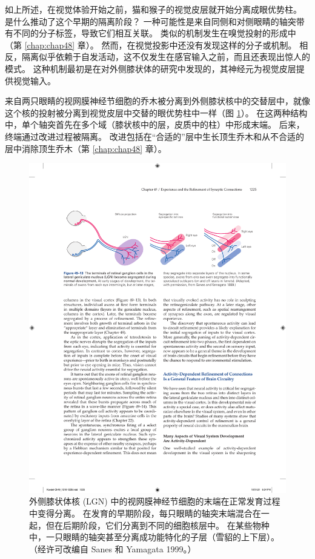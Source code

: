 如上所述，在视觉体验开始之前，猫和猴子的视觉皮层就开始分离成眼优势柱。
是什么推动了这个早期的隔离阶段？
一种可能性是来自同侧和对侧眼睛的轴突带有不同的分子标签，导致它们相互关联。
类似的机制发生在嗅觉投射的形成中（第 \ref{chap:chap48} 章）。
然而，在视觉投影中还没有发现这样的分子或机制。
相反，隔离似乎依赖于自发活动，这不仅发生在感官输入之前，而且还表现出惊人的模式。
这种机制最初是在对外侧膝状体的研究中发现的，其神经元为视觉皮层提供视觉输入。


来自两只眼睛的视网膜神经节细胞的乔木被分离到外侧膝状核中的交替层中，就像这个核的投射被分离到视觉皮层中交替的眼优势柱中一样（图 \ref{fig:49_13}）。 
在这两种结构中，单个轴突首先在多个域（膝状核中的层，皮质中的柱）中形成末端。
后来，终端通过改进过程被隔离。
改进包括在“合适的”层中生长顶生乔木和从不合适的层中消除顶生乔木（第 \ref{chap:chap48} 章）。


\begin{figure}[htbp]
	\centering
	\includegraphics[width=0.9\linewidth]{chap49/fig_49_13}
	\caption{外侧膝状体核 (LGN) 中的视网膜神经节细胞的末端在正常发育过程中变得分离。 在发育的早期阶段，每只眼睛的轴突末端混合在一起，但在后期阶段，它们分离到不同的细胞核层中。 在某些物种中，一只眼睛的轴突甚至分离成功能特化的子层（雪貂的上下层）。 （经许可改编自 Sanes 和 Yamagata 1999。）}
	\label{fig:49_13}
\end{figure}


